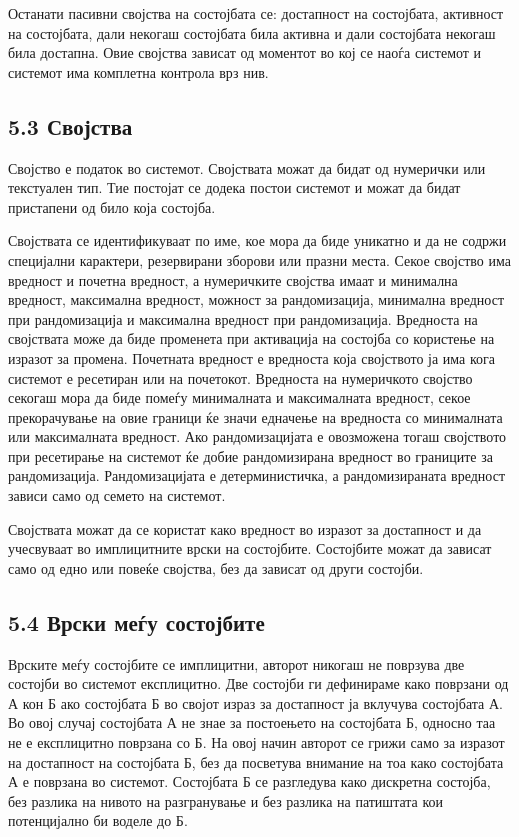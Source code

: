 Останати пасивни својства на состојбата се: достапност на состојбата, активност на состојбата, дали некогаш состојбата била активна и дали состојбата некогаш била достапна. Овие својства зависат од моментот во кој се наоѓа системот и системот има комплетна контрола врз нив.

\subsection{5.3 Својства}

Својство е податок во системот. Својствата можат да бидат од нумерички или текстуален тип. Тие постојат се додека постои системот и можат да бидат пристапени од било која состојба.

Својствата се идентификуваат по име, кое мора да биде уникатно и да не содржи специјални карактери, резервирани зборови или празни места. Секое својство има вредност и почетна вредност, а нумеричките својства имаат и минимална вредност, максимална вредност, можност за рандомизација, минимална вредност при рандомизација и максимална вредност при рандомизација. Вредноста на својствата може да биде променета при активација на состојба со користење на изразот за промена. Почетната вредност е вредноста која својството ја има кога системот е ресетиран или на почетокот. Вредноста на нумеричкото својство секогаш мора да биде помеѓу минималната и максималната вредност, секое прекорачување на овие граници ќе значи едначење на вредноста со минималната или максималната вредност. Ако рандомизацијата е овозможена тогаш својството при ресетирање на системот ќе добие рандомизирана вредност во границите за рандомизација. Рандомизацијата е детерминистичка, а рандомизираната вредност зависи само од семето на системот.

Својствата можат да се користат како вредност во изразот за достапност и да учесвуваат во имплицитните врски на состојбите. Состојбите можат да зависат само од едно или повеќе својства, без да зависат од други состојби.

\subsection{5.4 Врски меѓу состојбите}

Врските меѓу состојбите се имплицитни, авторот никогаш не поврзува две состојби во системот експлицитно. Две состојби ги дефинираме како поврзани од А кон Б ако состојбата Б во својот израз за достапност ја вклучува состојбата А. Во овој случај состојбата А не знае за постоењето на состојбата Б, односно таа не е експлицитно поврзана со Б. На овој начин авторот се грижи само за изразот на достапност на состојбата Б, без да посветува внимание на тоа како состојбата А е поврзана во системот. Состојбата Б се разгледува како дискретна состојба, без разлика на нивото на разгранување и без разлика на патиштата кои потенцијално би воделе до Б.

